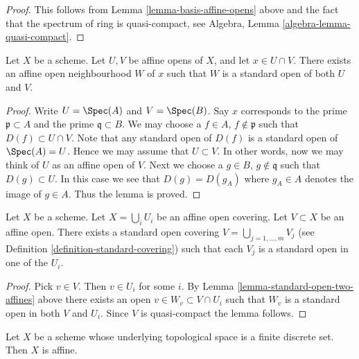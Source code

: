 \begin{proof}
This follows from Lemma \ref{lemma-basis-affine-opens} above
and the fact that the spectrum of ring is quasi-compact, see
Algebra, Lemma \ref{algebra-lemma-quasi-compact}.
\end{proof}

\begin{lemma}
\label{lemma-standard-open-two-affines}
Let $X$ be a scheme.
Let $U, V$ be affine opens of $X$, and let $x \in U \cap V$.
There exists an affine open neighbourhood $W$ of $x$
such that $W$ is a standard open of both $U$ and $V$.
\end{lemma}

\begin{proof}
Write $U = \Spec(A)$ and $V = \Spec(B)$.
Say $x$ corresponds to the prime $\mathfrak p \subset A$
and the prime $\mathfrak q \subset B$.
We may choose a $f \in A$, $f \not \in \mathfrak p$ such that
$D(f) \subset U \cap V$. Note that any standard open of $D(f)$
is a standard open of $\Spec(A) = U$. Hence we may assume
that $U \subset V$. In other words, now we may think of $U$
as an affine open of $V$. Next we choose a
$g \in B$, $g \not \in \mathfrak q$ such that
$D(g) \subset U$. In this case we see that $D(g) = D(g_A)$
where $g_A \in A$ denotes the image of $g \in A$. Thus the lemma
is proved.
\end{proof}

\begin{lemma}
\label{lemma-good-subcover}
Let $X$ be a scheme.
Let $X = \bigcup_i U_i$ be an affine open covering.
Let $V \subset X$ be an affine open.
There exists a standard open covering
$V = \bigcup_{j = 1, \ldots, m} V_j$ (see
Definition \ref{definition-standard-covering})
such that each $V_j$ is a standard open in one of the $U_i$.
\end{lemma}

\begin{proof}
Pick $v \in V$. Then $v \in U_i$ for some $i$.
By Lemma \ref{lemma-standard-open-two-affines} above there exists an open
$v \in W_v \subset V \cap U_i$ such that
$W_v$ is a standard open in both $V$ and $U_i$.
Since $V$ is quasi-compact the lemma follows.
\end{proof}

\begin{lemma}
\label{lemma-scheme-finite-discrete-affine}
Let $X$ be a scheme whose underlying topological space
is a finite discrete set.
Then $X$ is affine.
\end{lemma}

